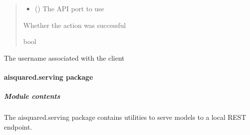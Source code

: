 \documentclass[letterpaper,10pt,english]{sphinxmanual}
\begin{document}
\begin{fulllineitems}
\begin{fulllineitems}
\begin{quote}
\begin{description}
\begin{itemize}
\item {} 
\sphinxAtStartPar
{} (\sphinxstyleliteralemphasis{\sphinxupquote{ (}}\sphinxstyleliteralemphasis{\sphinxupquote{)}}) \textendash{} The API port to use

\end{itemize}

\sphinxAtStartPar
{} \textendash{} Whether the action was successful

\sphinxAtStartPar
bool

\end{description}\end{quote}

\end{fulllineitems}


\begin{fulllineitems}
\label{\detokenize{aisquared.platform:aisquared.platform.AISquaredPlatformClient.AISquaredPlatformClient.username}}
\pysigstartsignatures
{}
\pysigstopsignatures
\sphinxAtStartPar
The username associated with the client

\end{fulllineitems}


\end{fulllineitems}


\sphinxstepscope


\paragraph{aisquared.serving package}
\label{\detokenize{aisquared.serving:aisquared-serving-package}}\label{\detokenize{aisquared.serving::doc}}

\subparagraph{Module contents}
\label{\detokenize{aisquared.serving:module-aisquared.serving}}\label{\detokenize{aisquared.serving:module-contents}}
\sphinxAtStartPar
The aisquared.serving package contains utilities to serve models to a local REST endpoint.
\end{document}
